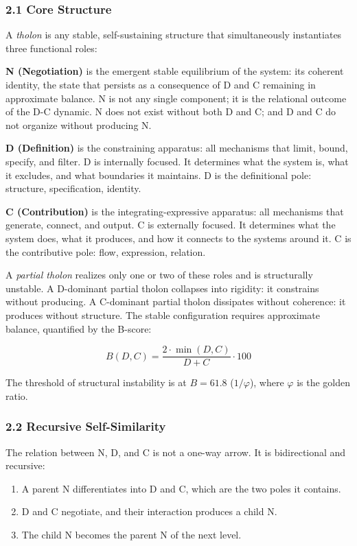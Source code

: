 \documentclass[
  11pt,
  letterpaper,
]{article}
\providecommand{\tightlist}{%
  \setlength{\itemsep}{0pt}\setlength{\parskip}{0pt}}
\begin{document}
\subsubsection{2.1 Core Structure}\label{core-structure}

A \emph{tholon} is any stable, self-sustaining structure that
simultaneously instantiates three functional roles:

\textbf{N (Negotiation)} is the emergent stable equilibrium of the
system: its coherent identity, the state that persists as a consequence
of D and C remaining in approximate balance. N is not any single
component; it is the relational outcome of the D-C dynamic. N does not
exist without both D and C; and D and C do not organize without
producing N.

\textbf{D (Definition)} is the constraining apparatus: all mechanisms
that limit, bound, specify, and filter. D is internally focused. It
determines what the system is, what it excludes, and what boundaries it
maintains. D is the definitional pole: structure, specification,
identity.

\textbf{C (Contribution)} is the integrating-expressive apparatus: all
mechanisms that generate, connect, and output. C is externally focused.
It determines what the system does, what it produces, and how it
connects to the systems around it. C is the contributive pole: flow,
expression, relation.

A \emph{partial tholon} realizes only one or two of these roles and is
structurally unstable. A D-dominant partial tholon collapses into
rigidity: it constrains without producing. A C-dominant partial tholon
dissipates without coherence: it produces without structure. The stable
configuration requires approximate balance, quantified by the B-score:

\[B(D,C) = \frac{2 \cdot \min(D,C)}{D + C} \cdot 100\]

The threshold of structural instability is at \(B = 61.8\)
(\(1/\varphi\)), where \(\varphi\) is the golden ratio.

\subsubsection{2.2 Recursive
Self-Similarity}\label{recursive-self-similarity}

The relation between N, D, and C is not a one-way arrow. It is
bidirectional and recursive:

\begin{enumerate}
\def\labelenumi{\arabic{enumi}.}
\tightlist
\item
  A parent N differentiates into D and C, which are the two poles it
  contains.
\item
  D and C negotiate, and their interaction produces a child N.
\item
  The child N becomes the parent N of the next level.
\end{enumerate}
\end{document}

